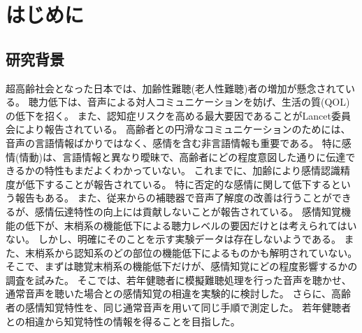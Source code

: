 
\chapter{はじめに}
\label{chap:Intro}


\section{研究背景}
\label{sec:研究背景}
超高齢社会となった日本では、加齢性難聴(老人性難聴)者の増加が懸念されている。
聴力低下は、音声による対人コミュニケーションを妨げ、生活の質(QOL)の低下を招く。
また、認知症リスクを高める最大要因であることがLancet委員会により報告されている\cite{livingston2020dementia}。
高齢者との円滑なコミュニケーションのためには、音声の言語情報ばかりではなく、感情を含む非言語情報も重要である。
特に感情(情動)は、言語情報と異なり曖昧で、高齢者にどの程度意図した通りに伝達できるかの特性もまだよくわかっていない。
これまでに、加齢により感情認識精度が低下することが報告されている\cite{paulmann2008aging,ben2019age,amorim2021changes}。
特に否定的な感情に関して低下するという報告もある\cite{mill2009age}。
また、従来からの補聴器で音声了解度の改善は行うことができるが、感情伝達特性の向上には貢献しないことが報告されている\cite{goy2018hearing}。
感情知覚機能の低下が、末梢系の機能低下による聴力レベルの要因だけとは考えられてはいない。
しかし、明確にそのことを示す実験データは存在しないようである。
また、末梢系から認知系のどの部位の機能低下によるものかも解明されていない。
そこで、まずは聴覚末梢系の機能低下だけが、感情知覚にどの程度影響するかの調査を試みた。
そこでは、若年健聴者に模擬難聴処理を行った音声を聴かせ、通常音声を聴いた場合との感情知覚の相違を実験的に検討した。
さらに、高齢者の感情知覚特性を、同じ通常音声を用いて同じ手順で測定した。
若年健聴者との相違から知覚特性の情報を得ることを目指した。

